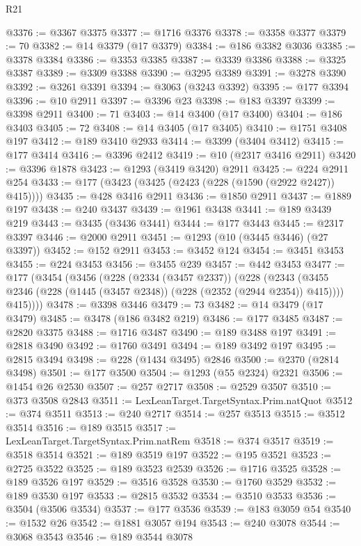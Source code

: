 \begin{lexlean}{R21}
\begin{coremodule}
@3376 := @3367 @3375
@3377 := @1716 @3376
@3378 := @3358 @3377
@3379 := 70
@3382 := @14 @3379 (@17 @3379)
@3384 := @186 @3382 @3036
@3385 := @3378 @3384
@3386 := @3353 @3385
@3387 := @3339 @3386
@3388 := @3325 @3387
@3389 := @3309 @3388
@3390 := @3295 @3389
@3391 := @3278 @3390
@3392 := @3261 @3391
@3394 := @3063 (@3243 @3392)
@3395 := @177 @3394
@3396 := @10 @2911
@3397 := @3396 @23
@3398 := @183 @3397
@3399 := @3398 @2911
@3400 := 71
@3403 := @14 @3400 (@17 @3400)
@3404 := @186 @3403
@3405 := 72
@3408 := @14 @3405 (@17 @3405)
@3410 := @1751 @3408 @197
@3412 := @189 @3410 @2933
@3414 := @3399 (@3404 @3412)
@3415 := @177 @3414
@3416 := @3396 @2412
@3419 := @10 (@2317 @3416 @2911)
@3420 := @3396 @1878
@3423 := @1293 (@3419 @3420) @2911
@3425 := @224 @2911 @254
@3433 := @177 (@3423 (@3425 (@2423 (@228 (@1590 (@2922 @2427)) @415))))
@3435 := @428 @3416 @2911
@3436 := @1850 @2911
@3437 := @1889 @197
@3438 := @240 @3437
@3439 := @1961 @3438
@3441 := @189 @3439 @219
@3443 := @3435 (@3436 @3441)
@3444 := @177 @3443
@3445 := @2317 @3397
@3446 := @2000 @2911
@3451 := @1293 (@10 (@3445 @3446) (@27 @3397))
@3452 := @152 @2911
@3453 := @3452 @124
@3454 := @3451 @3453
@3455 := @224 @3453
@3456 := @3455 @239
@3457 := @442 @3453
@3477 := @177
    (@3454
      (@3456
        (@228
          (@2334 (@3457 @2337))
          (@228
            (@2343 (@3455 @2346 (@228 (@1445 (@3457 @2348)) (@228 (@2352 (@2944 @2354)) @415))))
            @415))))
@3478 := @3398 @3446
@3479 := 73
@3482 := @14 @3479 (@17 @3479)
@3485 := @3478 (@186 @3482 @219)
@3486 := @177 @3485
@3487 := @2820 @3375
@3488 := @1716 @3487
@3490 := @189 @3488 @197
@3491 := @2818 @3490
@3492 := @1760 @3491
@3494 := @189 @3492 @197
@3495 := @2815 @3494
@3498 := @228 (@1434 @3495) @2846
@3500 := @2370 (@2814 @3498)
@3501 := @177 @3500
@3504 := @1293 (@55 @2324) @2321
@3506 := @1454 @26 @2530
@3507 := @257 @2717
@3508 := @2529 @3507
@3510 := @373 @3508 @2843
@3511 := LexLeanTarget.TargetSyntax.Prim.natQuot
@3512 := @374 @3511
@3513 := @240 @2717
@3514 := @257 @3513
@3515 := @3512 @3514
@3516 := @189 @3515
@3517 := LexLeanTarget.TargetSyntax.Prim.natRem
@3518 := @374 @3517
@3519 := @3518 @3514
@3521 := @189 @3519 @197
@3522 := @195 @3521
@3523 := @2725 @3522
@3525 := @189 @3523 @2539
@3526 := @1716 @3525
@3528 := @189 @3526 @197
@3529 := @3516 @3528
@3530 := @1760 @3529
@3532 := @189 @3530 @197
@3533 := @2815 @3532
@3534 := @3510 @3533
@3536 := @3504 (@3506 @3534)
@3537 := @177 @3536
@3539 := @183 @3059 @54
@3540 := @1532 @26
@3542 := @1881 @3057 @194
@3543 := @240 @3078
@3544 := @3068 @3543
@3546 := @189 @3544 @3078

\end{coremodule}
\end{lexlean}

